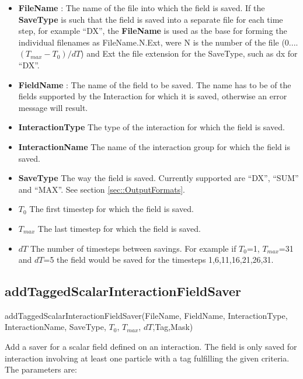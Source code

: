 \documentclass{report}
\begin{document}
\begin{itemize}
\item \textbf{FileName} : The name of the file into which the field is saved. If the  \textbf{SaveType} is such that the field is saved into a separate file for each time step, for example ``DX'', the \textbf{FileName} is used as the base for forming the individual filenames as FileName.N.Ext, were N is the number of the file (0....$(T_{max}-T_0)/dT$) and Ext the file extension for the SaveType, such as dx for ``DX''.
\item \textbf{FieldName} : The name of the field to be saved. The name has to be of the fields supported by the Interaction for which it is saved, otherwise an error message will result.
\item \textbf{InteractionType} The type of the interaction for which the field is saved.
\item \textbf{InteractionName} The name of the interaction group for which the field is saved.
\item \textbf{SaveType} The way the field is saved. Currently supported are ``DX'', ``SUM'' and ``MAX''. See section \ref{sec::OutputFormats}.
\item \textbf{$T_0$} The first timestep for which the field is saved.
\item \textbf{$T_{max}$} The last timestep for which the field is saved.
\item \textbf{$dT$} The number of timesteps between savings. For example if $T_0$=1, $T_{max}$=31 and $dT$=5 the field would be saved for the timesteps 1,6,11,16,21,26,31.
\end{itemize}

\subsection{addTaggedScalarInteractionFieldSaver}
\label{sec::TaggedSIFSaver}
\textsf{addTaggedScalarInteractionFieldSaver(FileName, FieldName, InteractionType, InteractionName, SaveType, $T_0$, $T_{max}$, $dT$,Tag,Mask)}
\par \medskip

Add a saver for a scalar field defined on an interaction. The field is only saved for interaction involving at least one particle with a tag fulfilling the given criteria. The parameters are:
\end{document}
